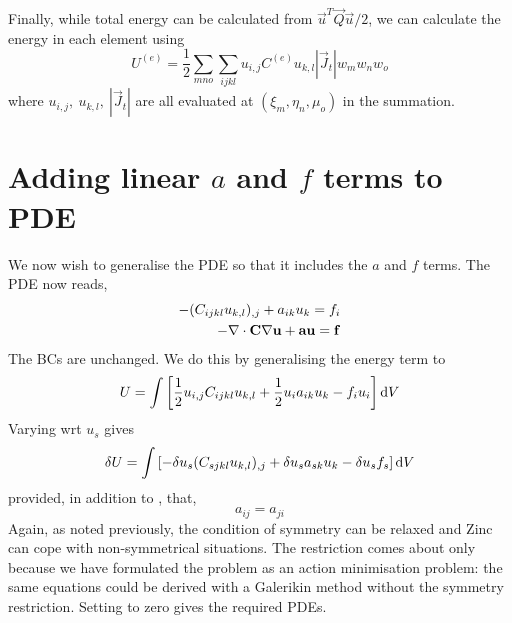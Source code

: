 \documentclass[a4paper]{article}
\begin{document}
Finally, while total energy can be calculated from $\vec u^T\vec Q\vec
u/2$, we can calculate the energy in each element using
\begin{equation}
  U^{(e)}=\frac12\sum_{mno}\sum_{ijkl} 
u_{i,j} C^{(e)} u_{k,l} |\vec J_t|w_m w_n w_o
\label{elen}
\end{equation}
where $u_{i,j},~u_{k,l},~|\vec J_t|$ are all evaluated at
$(\xi_m,\eta_n,\mu_o)$ in the summation.

\section{Adding linear $a$ and $f$ terms to PDE}
\label{adding}

We now wish to generalise the PDE so that it includes the $a$ and $f$
terms. The PDE now reads,
\begin{eqnarray}
  -(C_{ijkl} u_{k,l})_{,j}+a_{ik} u_k=f_i\\
  -\nabla\cdot\mathbf{C}\nabla\mathbf{u} +\mathbf{a}\mathbf{u}=\mathbf{f}
  \label{genPDE}
\end{eqnarray}
The BCs are unchanged. We do this by generalising the energy term to
\begin{equation}
  U=\int \left[\frac12 u_{i,j}C_{ijkl}u_{k,l}
+\frac12 u_i a_{ik} u_k-f_i u_i\right]\mathrm{d} V
\end{equation}
Varying wrt $u_s$ gives
\begin{equation}
  \delta U=\int \left[-\delta u_s(C_{sjkl} u_{k,l})_{,j}
+\delta u_s a_{sk} u_k-\delta u_s f_s\right]\mathrm{d} V
\label{delUadd}
\end{equation}
provided, in addition to , that,
\begin{equation}
  a_{ij}=a_{ji}
\end{equation}
Again, as noted previously, the condition of symmetry can be relaxed
and Zinc can cope with non-symmetrical situations. The restriction
comes about only because we have formulated the problem as an action
minimisation problem: the same equations could be derived with a
Galerikin method without the symmetry restriction. Setting
 to zero gives the required PDEs.
\end{document}
